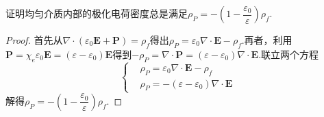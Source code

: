 \documentclass{mynote}
\begin{document}
\begin{exercise}{1.9}
    证明均匀介质内部的极化电荷密度总是满足$\rho_P = -\left( 1 - \dfrac{\varepsilon_0}{\varepsilon} \right) \rho_f$.
\end{exercise}
\begin{proof}
    首先从$\nabla \cdot (\varepsilon_0 \bm{E} + \bm{P}) = \rho_f$得出$\rho_P = \varepsilon_0 \nabla \cdot \bm{E} - \rho_f $.再者，利用$\bm{P} = \chi_e \varepsilon_0 \bm{E} = (\varepsilon - \varepsilon_0) \bm{E} $得到$-\rho_P = \nabla \cdot \bm{P} = (\varepsilon - \varepsilon_0) \nabla \cdot \bm{E}$.联立两个方程
    \[
    \left\{
        \begin{aligned}
            & \rho_P = \varepsilon_0 \nabla \cdot \bm{E} - \rho_f \\
            & \rho_P = -(\varepsilon - \varepsilon_0) \nabla \cdot \bm{E}
        \end{aligned} 
    \right.    
    \]
    解得$\rho_P = -\left( 1 - \dfrac{\varepsilon_0}{\varepsilon} \right) \rho_f$.
\end{proof}
\end{document}
